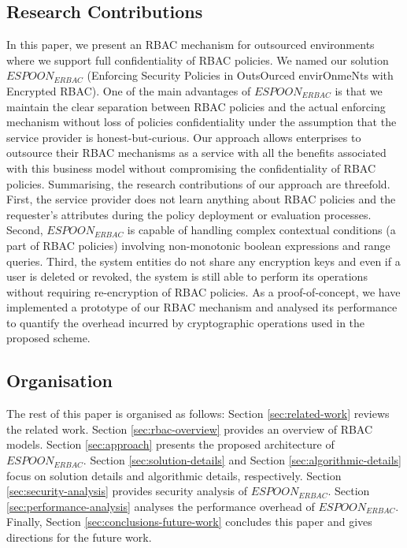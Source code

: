 \documentclass[final,5p,times,twocolumn]{elsarticle}
\begin{document}
\subsection{Research Contributions}
In this paper, we present an RBAC mechanism for outsourced environments where we support full confidentiality of RBAC policies. We named our solution \textbf{$\mathit{ESPOON_{ERBAC}}$} (Enforcing Security Policies in OutsOurced envirOnmeNts with Encrypted RBAC). One of the main advantages of $\mathit{ESPOON_{ERBAC}}$ is that we maintain the clear separation between RBAC policies and the actual enforcing mechanism without loss of policies confidentiality under the assumption that the service provider is honest-but-curious. Our approach allows enterprises to outsource their RBAC mechanisms as a service with all the benefits associated with this business model without compromising the confidentiality of RBAC policies. Summarising, the research contributions of our approach are threefold. First, the service provider does not learn anything about RBAC policies and the requester's attributes during the policy deployment or evaluation processes. Second, $\mathit{ESPOON_{ERBAC}}$ is capable of handling complex contextual conditions (a part of RBAC policies) involving non-monotonic boolean expressions and range queries. Third, the system entities do not share any encryption keys and even if a user is deleted or revoked, the system is still able to perform its operations without requiring re-encryption of RBAC policies. As a proof-of-concept, we have implemented a prototype of our RBAC mechanism and analysed its performance to quantify the overhead incurred by cryptographic operations used in the proposed scheme.

\subsection{Organisation}
The rest of this paper is organised as follows: Section \ref{sec:related-work} reviews the related work. Section \ref{sec:rbac-overview} provides an overview of RBAC models. Section \ref{sec:approach} presents the proposed architecture of $\mathit{ESPOON_{ERBAC}}$. Section \ref{sec:solution-details} and Section \ref{sec:algorithmic-details} focus on solution details and algorithmic details, respectively. Section \ref{sec:security-analysis} provides security analysis of $\mathit{ESPOON_{ERBAC}}$. Section \ref{sec:performance-analysis} analyses the performance overhead of $\mathit{ESPOON_{ERBAC}}$. Finally, Section \ref{sec:conclusions-future-work} concludes this paper and gives directions for the future work.
\end{document}
